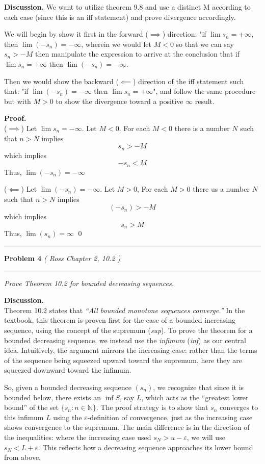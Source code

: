 \documentclass[12pt]{article}
\newcommand{\problem}[2][]{%
  \vspace{0.5em}
  \hrule\vspace{0.4em}
  \textbf{Problem #2}\if\relax\detokenize{#1}\relax\else\; \textit{(#1)}\fi
  \vspace{0.25em}\hrule\vspace{0.8em}
}
\begin{document}
\textbf{Discussion.}
We want to utilize theorem 9.8 and use a distinct M according to each case (since this is an iff statement) and prove divergence accordingly.

We will begin by show it first in the forward ($\implies$) direction: "if $\lim s_n = + \infty$, then $\lim (-s_n) = -\infty$, wherein we would let $M < 0$ so that we can say $ s_n > -M$ then manipulate the expression to arrive at the conclusion that if $\lim s_n = +\infty$ then $\lim (-s_n) = - \infty$.

Then we would show the backward ($\impliedby$) direction of the iff statement such that: "if $\lim (-s_n) = -\infty$ then $\lim s_n = + \infty$", and follow the same procedure but with $M>0$ to show the divergence toward a positive $\infty$ result.
\vspace{0.25em}

\textbf{Proof.}\\
    ($\implies$) Let $\lim s_n = - \infty$. Let $M < 0$. For each $M < 0$ there is a number $N$ such that $n > N$ implies
    \[
    s_n > -M
    \]
    which implies
    \[
    -s_n < M
    \]
    Thus, $\lim (-s_n) = -\infty$ \\ 

\bigskip

    ($\impliedby$) Let $\lim(-s_n) = - \infty$. Let $M > 0$, For each $M > 0$ there us a number $N$ such that $n>N$ implies 
    \[
    (-s_n) > -M
    \]
    which implies
    \[
    s_n > M
    \]
    Thus, $\lim(s_n) = \infty$
\qed

\problem[ Ross Chapter 2, 10.2 ]{4}

\textit{Prove Theorem 10.2 for bounded decreasing sequences.}
\vspace{0.75em}

\textbf{Discussion.}\\
Theorem 10.2 states that \textit{“All bounded monotone sequences converge.”} In the textbook, this theorem is proven first for the case of a bounded increasing sequence, using the concept of the supremum (\textit{sup}). To prove the theorem for a bounded decreasing sequence, we instead use the \textit{infimum} (\textit{inf}) as our central idea. Intuitively, the argument mirrors the increasing case: rather than the terms of the sequence being squeezed upward toward the supremum, here they are squeezed downward toward the infimum.

So, given a bounded decreasing sequence $(s_n)$, we recognize that since it is bounded below, there exists an $\inf S$, say $L$, which acts as the “greatest lower bound” of the set $\{s_n : n \in \mathbb{N}\}$. The proof strategy is to show that $s_n$ converges to this infimum $L$ using the $\varepsilon$-definition of convergence, just as the increasing case shows convergence to the supremum. The main difference is in the direction of the inequalities: where the increasing case used $s_N > u - \varepsilon$, we will use $s_N < L + \varepsilon$. This reflects how a decreasing sequence approaches its lower bound from above.
\end{document}
